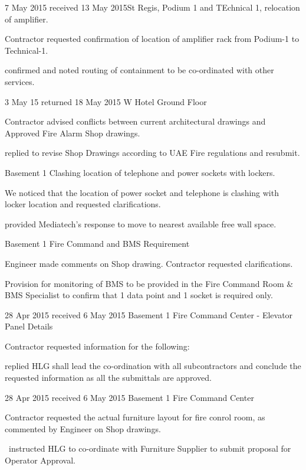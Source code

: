 {7 May 2015 received 13 May 2015}{St Regis, Podium 1 and TEchnical 1, relocation of amplifier. }
 {
	\item Contractor requested confirmation of location of amplifier rack from Podium-1 to Technical-1.
	\item \KA confirmed and noted routing of containment to be co-ordinated with other services.
 } 

 {3 May 15 returned 18 May 2015} {W Hotel Ground Floor }
 {
	\item Contractor advised conflicts between current architectural drawings and Approved Fire Alarm Shop drawings.
	\item \KA replied to revise Shop Drawings according to UAE Fire regulations and resubmit.
 }
 
  {} {Basement 1 Clashing location of telephone and power sockets with lockers.}
  {
    \item We noticed that the location of power socket and telephone is clashing with locker location and requested clarifications.
    \item \KA provided Mediatech's response to move to nearest available free wall space.
  }

  {} {Basement 1 Fire Command and BMS Requirement}
  {
    \item Engineer made comments on \JV Shop drawing. Contractor requested clarifications.
    \item Provision for monitoring of BMS to be provided in the Fire Command Room \JV \& BMS Specialist to confirm that 1 data point and 1 socket is required only.
  }
  
 {28 Apr 2015 received 6 May 2015} {Basement 1 Fire Command Center - Elevator Panel Details} 
 {
 	\item Contractor requested information for the following:
 	\item \KA replied HLG shall lead the co-ordination with all subcontractors and conclude the requested information as all the submittals are approved. 
 	
 	\delay\delay\delay
 	
 }
 
 {28 Apr 2015 received 6 May 2015} {Basement 1 Fire Command Center} 
 {
	\item Contractor requested the actual furniture layout for fire conrol room, as commented by Engineer on Shop drawings.
	\item \KA\ instructed HLG to co-ordinate with Furniture Supplier to submit proposal for Operator Approval.
	
	\delay\delay\delay
 }

